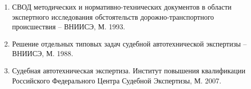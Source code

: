 \begin{enumerate}
\item 
 СВОД методических и нормативно-технических документов в области экспертного исследования обстоятельств дорожно-транспортного происшествия – ВНИИСЭ, М. 1993.
\item 
 Решение отдельных типовых задач судебной автотехнической экспертизы – ВНИИСЭ, М. 1988.
%
%
%
\item Судебная автотехническая экспертиза. Институт повышения квалификации Российского Федерального Центра Судебной Экспертизы, М. 2007.
%

\end{enumerate}
